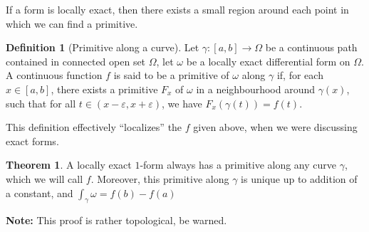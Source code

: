 \documentclass[aps,pra,showpacs,notitlepage,onecolumn,superscriptaddress,nofootinbib]{revtex4-1}
\theoremstyle{definition}
\newtheorem{definition}{Definition}[section]
\newtheorem{theorem}{Theorem}[section]
\begin{document}
If a form is locally exact, then there exists a small region around each point in which we can find a primitive.

\begin{definition}[Primitive along a curve]
  Let $\gamma : [a, b] \rightarrow \Omega$ be a continuous path contained in connected open set $\Omega$, let $\omega$ be a locally exact differential form on $\Omega$. A continuous function
  $f$ is said to be a primitive of $\omega$ along $\gamma$ if, for each $x \in [a, b]$, there exists a primitive $F_x$ of $\omega$ in a neighbourhood around $\gamma(x)$, such that
  for all $t \in (x - \varepsilon, x + \varepsilon)$, we have $F_x(\gamma(t)) = f(t)$.
\end{definition}

\noindent This definition effectively ``localizes'' the $f$ given above, when we were discussing exact forms.

\begin{theorem}
  \label{thm:loc}
  A locally exact $1$-form always has a primitive along any curve $\gamma$, which we will call $f$. Moreover, this primitive along $\gamma$ is
  unique up to addition of a constant, and $\int_{\gamma} \omega = f(b) - f(a)$
\end{theorem}

\noindent \textbf{Note:} This proof is rather topological, be warned.
\end{document}
